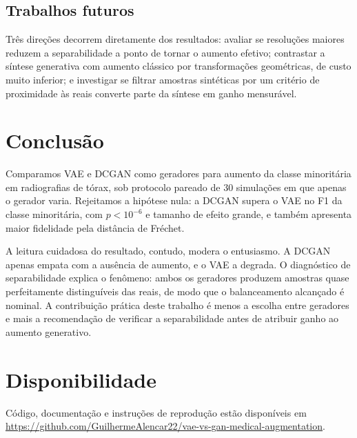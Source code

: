 \documentclass[conference]{IEEEtran}
\begin{document}
\subsection{Trabalhos futuros}

Três direções decorrem diretamente dos resultados: avaliar se resoluções
maiores reduzem a separabilidade a ponto de tornar o aumento efetivo;
contrastar a síntese generativa com aumento clássico por transformações
geométricas, de custo muito inferior; e investigar se filtrar amostras
sintéticas por um critério de proximidade às reais converte parte da síntese em
ganho mensurável.

\section{Conclusão}

Comparamos VAE e DCGAN como geradores para aumento da classe minoritária em
radiografias de tórax, sob protocolo pareado de $30$ simulações em que apenas o
gerador varia. Rejeitamos a hipótese nula: a DCGAN supera o VAE no F1 da classe
minoritária, com $p < 10^{-6}$ e tamanho de efeito grande, e também apresenta
maior fidelidade pela distância de Fréchet.

A leitura cuidadosa do resultado, contudo, modera o entusiasmo. A DCGAN apenas
empata com a ausência de aumento, e o VAE a degrada. O diagnóstico de
separabilidade explica o fenômeno: ambos os geradores produzem amostras quase
perfeitamente distinguíveis das reais, de modo que o balanceamento alcançado é
nominal. A contribuição prática deste trabalho é menos a escolha entre
geradores e mais a recomendação de verificar a separabilidade antes de atribuir
ganho ao aumento generativo.

\section*{Disponibilidade}

Código, documentação e instruções de reprodução estão disponíveis em
\url{https://github.com/GuilhermeAlencar22/vae-vs-gan-medical-augmentation}.



\end{document}
